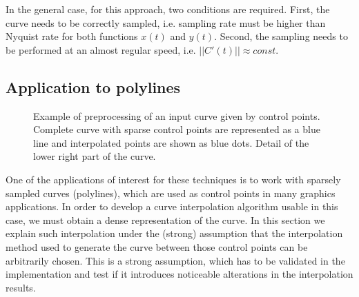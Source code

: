 \documentclass{ipol}
\newcommand{\chapFiveDir}{images/chapter_05a}
\begin{document}
In the general case, for this approach, two conditions are required. First, the curve needs to be correctly sampled, i.e. sampling rate must be higher than Nyquist rate for both functions $x(t)$ and $y(t)$.
Second, the sampling needs to be performed at an almost regular speed, i.e. $||C'(t)|| \approx const.$

\subsection{Application to polylines}\label{sec:curve_interpolation:curve_reconstruction:polylines}

\begin{figure}[h]
	\centering
	\caption{Example of preprocessing of an input curve given by control points. 
		\protect{} Complete curve with sparse control points are represented as a blue line and interpolated points are shown as blue dots.
		\protect{} Detail of the lower right part of the curve.
	}
	\label{fig:curve_interpolation:control_points}
\end{figure}

One of the applications of interest for these techniques is to work with sparsely sampled curves (polylines), which are used as control points in many graphics applications. In order to develop a curve interpolation algorithm usable in this case, we must obtain a dense representation of the curve. In this section we explain such interpolation under the (strong) assumption that the interpolation method used to generate  the curve between those control points can be arbitrarily chosen. This is a strong assumption, which has to be validated in the implementation  and test if it introduces noticeable alterations in the interpolation results.
\end{document}

